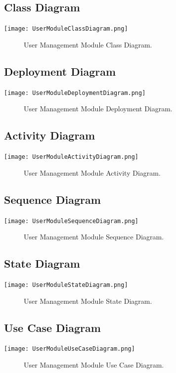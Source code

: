 \documentclass[12pt]{article}
\begin{document}
	\subsection{Class Diagram}
        \texttt{[image: UserModuleClassDiagram.png]}
        \begin{figure}[h]
            \caption{User Management Module Class Diagram.}
        \end{figure}
    
    \subsection{Deployment Diagram}
        \texttt{[image: UserModuleDeploymentDiagram.png]}
        \begin{figure}[h]
            \caption{User Management Module Deployment Diagram.}
        \end{figure}
        
    \subsection{Activity Diagram}
        \texttt{[image: UserModuleActivityDiagram.png]}
        \begin{figure}[h]
            \caption{User Management Module Activity Diagram.}
        \end{figure}

    \subsection{Sequence Diagram}
        \texttt{[image: UserModuleSequenceDiagram.png]}
        \begin{figure}[h]
            \caption{User Management Module Sequence Diagram.}
        \end{figure}

	
	\subsection{State Diagram}
       \texttt{[image: UserModuleStateDiagram.png]}
        \begin{figure}[h]
        	\caption{User Management Module State Diagram.}
        \end{figure}
	
	\subsection{Use Case Diagram}
        	\texttt{[image: UserModuleUseCaseDiagram.png]}
        	\begin{figure}[h]
        		\caption{User Management Module Use Case Diagram.}
        	\end{figure}
        	
\end{document}
